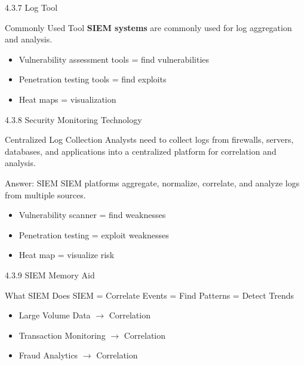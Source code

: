 \documentclass{beamer}
\begin{document}
	\begin{frame}{4.3.7 Log Tool}
		\begin{block}{Commonly Used Tool}
			\textbf{SIEM systems} are commonly used for log aggregation and analysis.
		\end{block}
		\begin{itemize}
			\item Vulnerability assessment tools = find vulnerabilities
			\item Penetration testing tools = find exploits
			\item Heat maps = visualization
		\end{itemize}
	\end{frame}
	
	\begin{frame}{4.3.8 Security Monitoring Technology}
		\begin{block}{Centralized Log Collection}
			Analysts need to collect logs from firewalls, servers, databases, and applications into a centralized platform for correlation and analysis.
		\end{block}
		\begin{exampleblock}{Answer: SIEM}
			SIEM platforms aggregate, normalize, correlate, and analyze logs from multiple sources.
		\end{exampleblock}
		\begin{itemize}
			\item Vulnerability scanner = find weaknesses
			\item Penetration testing = exploit weaknesses
			\item Heat map = visualize risk
		\end{itemize}
	\end{frame}
	
	\begin{frame}{4.3.9 SIEM Memory Aid}
		\begin{block}{What SIEM Does}
			SIEM = Correlate Events = Find Patterns = Detect Trends
		\end{block}
		\begin{itemize}
			\item Large Volume Data $\rightarrow$ Correlation
			\item Transaction Monitoring $\rightarrow$ Correlation
			\item Fraud Analytics $\rightarrow$ Correlation
		\end{itemize}
	\end{frame}
	
\end{document}
